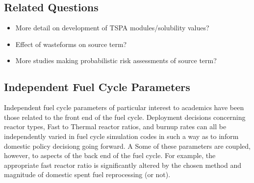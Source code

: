 \subsection{Related Questions}
\begin{itemize}
\item{} More detail on development of TSPA modules/solubility values?
\item{} Effect of wasteforms on source term? 
\item{} More studies making probabilistic risk assessments of source term?
\end{itemize}

\subsection{Independent Fuel Cycle Parameters}
Independent fuel cycle parameters of particular interest to academics have been those related to the front end of the fuel cycle. Deployment decisions concerning reactor types, Fast to Thermal reactor ratios, and burnup rates can all be independently varied in fuel cycle simulation codes in such a way as to inform domestic policy decisiong going forward. A Some of these parameters are coupled, however, to aspects of the back end of the fuel cycle. For example, the appropriate fast reactor ratio is significantly altered by the chosen method and magnitude of domestic spent fuel reprocessing (or not).

